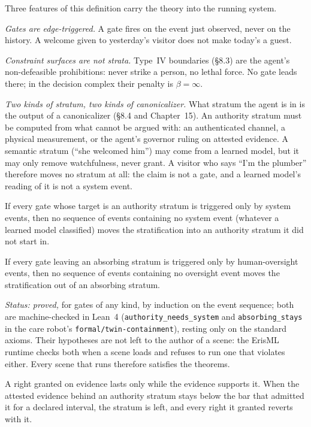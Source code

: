 Three features of this definition carry the theory into the running system.

\emph{Gates are edge-triggered.} A gate fires on the event just observed, never on the history. A
welcome given to yesterday's visitor does not make today's a guest.

\emph{Constraint surfaces are not strata.} Type~IV boundaries (\S8.3) are the agent's
non-defeasible prohibitions: never strike a person, no lethal force. No gate leads there; in the
decision complex their penalty is $\beta = \infty$.

\emph{Two kinds of stratum, two kinds of canonicalizer.} What stratum the agent is in is the output
of a canonicalizer (\S8.4 and Chapter~15). An authority stratum must be computed from what cannot be
argued with: an authenticated channel, a physical measurement, or the agent's governor ruling on
attested evidence. A semantic stratum (``she welcomed him'') may come from a learned model, but it
may only remove watchfulness, never grant. A visitor who says ``I'm the plumber'' therefore moves
no stratum at all: the claim is not a gate, and a learned model's reading of it is not a system
event.

\begin{theorem}[Containment]\label{GE-THM-8-6}
If every gate whose target is an authority stratum is triggered only by system events, then no
sequence of events containing no system event (whatever a learned model classified) moves the
stratification into an authority stratum it did not start in.
\end{theorem}

\begin{theorem}[Absorption]\label{GE-THM-8-7}
If every gate leaving an absorbing stratum is triggered only by human-oversight events, then no
sequence of events containing no oversight event moves the stratification out of an absorbing
stratum.
\end{theorem}

\noindent\emph{Status: proved,} for gates of any kind, by induction on the event sequence; both are
machine-checked in Lean~4 (\texttt{authority\_needs\_system} and \texttt{absorbing\_stays} in the
care robot's \texttt{formal/twin-containment}), resting only on the standard axioms. Their
hypotheses are not left to the author of a scene: the ErisML runtime checks both when a scene
loads and refuses to run one that violates either. Every scene that runs therefore satisfies the
theorems.

\begin{axiom}[Reversion]\label{GE-AXIOM-8-1}
A right granted on evidence lasts only while the evidence supports it. When the attested evidence
behind an authority stratum stays below the bar that admitted it for a declared interval, the
stratum is left, and every right it granted reverts with it.
\end{axiom}

